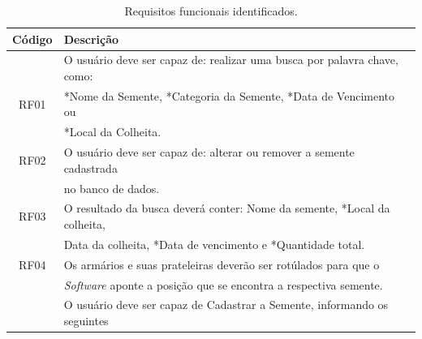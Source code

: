\documentclass[12pt,a4paper]{article}
\begin{document}
\begin{table}[H]
\centering
\hspace{0.1cm}
\caption{\label{tab:requisitosFuncionalidades}Requisitos funcionais identificados.}
\begin{tabular}{c|l}

\hline%
Código 	& Descrição 																\\ 
\hline%
		& O usuário deve ser capaz de: realizar uma busca por palavra chave, como:	\\ 
RF01	& *Nome da Semente, *Categoria da Semente, *Data de Vencimento ou \\
		&*Local da Colheita.	
							\\ 
\hline%
RF02	& O usuário deve ser capaz de: alterar ou remover a semente cadastrada\\ 
		&no banco de dados. \\				
\hline%
RF03	& O resultado da busca deverá conter: Nome da semente, *Local da colheita, \\ 
		&Data da colheita, *Data de vencimento e  *Quantidade total.										\\ 
\hline%
RF04 	& Os armários e suas prateleiras deverão ser rotúlados para que o 							\\
		&{\it Software} aponte a posição que se encontra a respectiva semente. \\
\hline%
 		& O usuário deve ser capaz de Cadastrar a Semente, informando os seguintes \\

\end{tabular}
\end{table}
\end{document}
